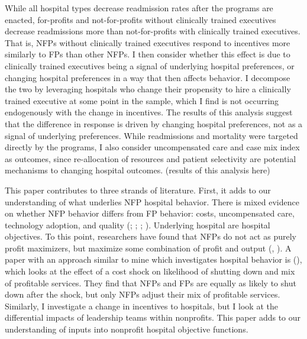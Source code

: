 \documentclass[12pt]{article}
\begin{document}
   While all hospital types decrease readmission rates after the programs are enacted, for-profits and not-for-profits without clinically trained executives decrease readmissions more than not-for-profits with clinically trained executives. That is, NFPs without clinically trained executives respond to incentives more similarly to FPs than other NFPs. I then consider whether this effect is due to clinically trained executives being a signal of underlying hospital preferences, or changing hospital preferences in a way that then affects behavior. I decompose the two by leveraging hospitals who change their propensity to hire a clinically trained executive at some point in the sample, which I find is not occurring endogenously with the change in incentives. The results of this analysis suggest that the difference in response is driven by changing hospital preferences, not as a signal of underlying preferences. While readmissions and mortality were targeted directly by the programs, I also consider uncompensated care and case mix index as outcomes, since re-allocation of resources and patient selectivity are potential mechanisms to changing hospital outcomes. (results of this analysis here)

    This paper contributes to three strands of literature. First, it adds to our understanding of what underlies NFP hospital behavior. There is mixed evidence on whether NFP behavior differs from FP behavior: costs, uncompensated care, technology adoption, and quality (\cite{sloan2000not}; \cite{eggleston2008hospital}; \cite{moscelli2018effect}; \cite{moscone2020public}). Underlying hospital are hospital objectives. To this point, researchers have found that NFPs do not act as purely profit maximizers, but maximize some combination of profit and output (\cite{deneffe2002not}, \cite{chang2011nonprofit}). A paper with an approach similar to mine which investigates hospital behavior is \citeauthor{chang2011nonprofit} (\citeyear{chang2011nonprofit}), which looks at the effect of a cost shock on likelihood of shutting down and mix of profitable services. They find that NFPs and FPs are equally as likely to shut down after the shock, but only NFPs adjust their mix of profitable services. Similarly, I investigate a change in incentives to hospitals, but I look at the differential impacts of leadership teams within nonprofits. This paper adds to our understanding of inputs into nonprofit hospital objective functions. 
\end{document}
